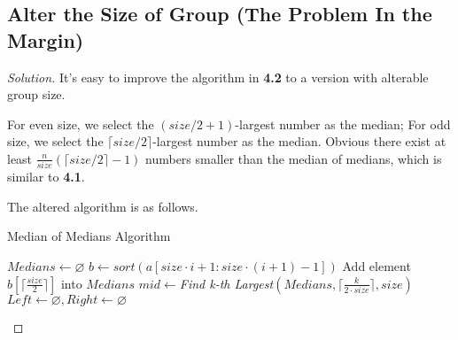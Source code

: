 \documentclass{article}
\newenvironment{solution}{\begin{proof}[\noindent\it Solution]}{\end{proof}}
\begin{document}
\subsection{Alter the Size of Group (The Problem In the Margin)}
\vspace{1em}
\begin{solution}
    It's easy to improve the algorithm in \textbf{4.2} to a version with alterable group size. 
    
    \hspace{2.5em}
    For even size, we select the $(size/{2}+1)$-largest number as the median; For odd size, we select the $\lceil{size}/{2}\rceil$-largest number as the median. Obvious there exist at least $\frac{n}{size}\left(\lceil size/2\rceil-1\right)$ numbers smaller than the median of medians, which is similar to \textbf{4.1}.
    
    \hspace{2.5em}
    The altered algorithm is as follows.

    \begin{algorithm}
        \caption{Median of Medians Algorithm}

	    {
	         
	        \BlankLine
	        \BlankLine
	        \BlankLine
	        $Medians\gets\varnothing$\;
	        {
	            $b\gets sort\left(a[size\cdot i+1:size\cdot (i+1)-1]\right)$\;
	            Add element $b[\lceil\frac{size}{2}\rceil]$ into $Medians$\;
	        }
	        $mid\gets$\textit{Find k-th Largest}$\left(Medians,\lceil\frac{k}{2\cdot size}\rceil,size\right)$\;
	        \BlankLine
	        \BlankLine
	        \BlankLine
	        $Left\gets\varnothing, Right\gets\varnothing$\;
	        {
	        }
	    }
    \end{algorithm}
    

\end{solution}
\end{document}
